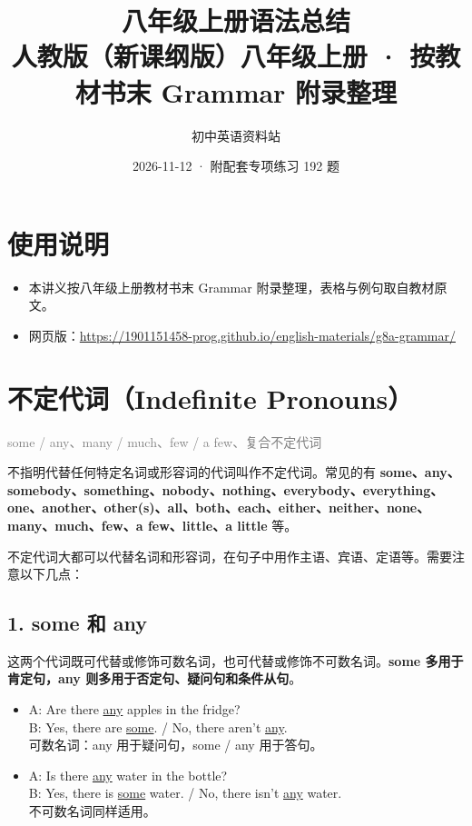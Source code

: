 \documentclass[11pt,a4paper]{ctexart}
\title{\textbf{八年级上册语法总结}\\[4pt]
\large 人教版（新课纲版）八年级上册 · 按教材书末 Grammar 附录整理}
\author{初中英语资料站}
\date{2026-11-12 · 附配套专项练习 192 题}
\begin{document}
\maketitle
\section*{使用说明}
\begin{itemize}[leftmargin=1.4em]
\item 本讲义按八年级上册教材书末 Grammar 附录整理，表格与例句取自教材原文。
\item 网页版：\url{https://1901151458-prog.github.io/english-materials/g8a-grammar/}
\end{itemize}

\section{不定代词（Indefinite Pronouns）}
\noindent\textcolor{gray}{some / any、many / much、few / a few、复合不定代词}\par\smallskip
不指明代替任何特定名词或形容词的代词叫作不定代词。常见的有 \textbf{some、any、somebody、something、nobody、nothing、everybody、everything、one、another、other(s)、all、both、each、either、neither、none、many、much、few、a few、little、a little} 等。

不定代词大都可以代替名词和形容词，在句子中用作主语、宾语、定语等。需要注意以下几点：

\subsection*{1. some 和 any}

这两个代词既可代替或修饰可数名词，也可代替或修饰不可数名词。\textbf{some 多用于肯定句，any 则多用于否定句、疑问句和条件从句}。

\begin{itemize}[leftmargin=1.4em]
\item A: Are there \underline{any} apples in the fridge?\\ B: Yes, there are \underline{some}. / No, there aren’t \underline{any}.\\ 可数名词：any 用于疑问句，some / any 用于答句。
\item A: Is there \underline{any} water in the bottle?\\ B: Yes, there is \underline{some} water. / No, there isn’t \underline{any} water.\\ 不可数名词同样适用。
\end{itemize}
\end{document}
